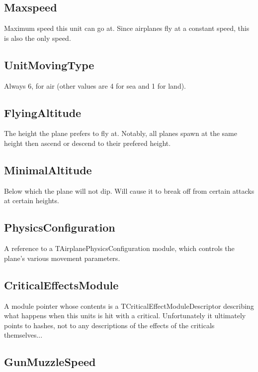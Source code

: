 \documentclass{article}
\begin{document}
\subsection{Maxspeed}

Maximum speed this unit can go at. Since airplanes fly at a constant speed, this is also the only speed.

\subsection{UnitMovingType}

Always 6, for air (other values are 4 for sea and 1 for land).

\subsection{FlyingAltitude}

The height the plane prefers to fly at. Notably, all planes spawn at the same height then ascend or descend to their prefered height.

\subsection{MinimalAltitude}

Below which the plane will not dip. Will cause it to break off from certain attacks at certain heights.

\subsection{PhysicsConfiguration}

A reference to a TAirplanePhysicsConfiguration module, which controls the plane's various movement parameters.

\subsection{CriticalEffectsModule}

A module pointer whose contents is a TCriticalEffectModuleDescriptor describing what happens when this units is hit with a critical. Unfortunately it ultimately points to hashes, not to any descriptions of the effects of the criticals themselves...

\subsection{GunMuzzleSpeed}
\end{document}

